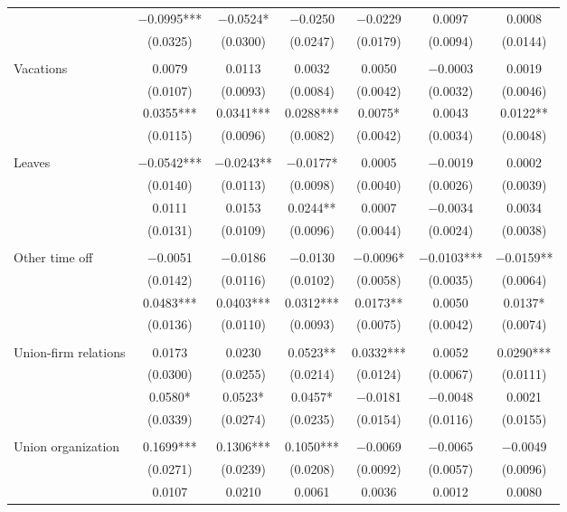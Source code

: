 \documentclass[12pt,letterpaper]{article}
\begin{document}
\begin{longtable}{l cccccc}
  & $-$0.0995*** & $-$0.0524* & $-$0.0250 & $-$0.0229 & 0.0097 & 0.0008 \\
  & (0.0325) & (0.0300) & (0.0247) & (0.0179) & (0.0094) & (0.0144) \\
 & & & & & & \\
\quad Vacations & 0.0079 & 0.0113 & 0.0032 & 0.0050 & $-$0.0003 & 0.0019 \\
  & (0.0107) & (0.0093) & (0.0084) & (0.0042) & (0.0032) & (0.0046) \\
  & 0.0355*** & 0.0341*** & 0.0288*** & 0.0075* & 0.0043 & 0.0122** \\
  & (0.0115) & (0.0096) & (0.0082) & (0.0042) & (0.0034) & (0.0048) \\
 & & & & & & \\
\quad Leaves & $-$0.0542*** & $-$0.0243** & $-$0.0177* & 0.0005 & $-$0.0019 & 0.0002 \\
  & (0.0140) & (0.0113) & (0.0098) & (0.0040) & (0.0026) & (0.0039) \\
  & 0.0111 & 0.0153 & 0.0244** & 0.0007 & $-$0.0034 & 0.0034 \\
  & (0.0131) & (0.0109) & (0.0096) & (0.0044) & (0.0024) & (0.0038) \\
 & & & & & & \\
\quad Other time off & $-$0.0051 & $-$0.0186 & $-$0.0130 & $-$0.0096* & $-$0.0103*** & $-$0.0159** \\
  & (0.0142) & (0.0116) & (0.0102) & (0.0058) & (0.0035) & (0.0064) \\
  & 0.0483*** & 0.0403*** & 0.0312*** & 0.0173** & 0.0050 & 0.0137* \\
  & (0.0136) & (0.0110) & (0.0093) & (0.0075) & (0.0042) & (0.0074) \\
 & & & & & & \\
\quad Union-firm relations & 0.0173 & 0.0230 & 0.0523** & 0.0332*** & 0.0052 & 0.0290*** \\
  & (0.0300) & (0.0255) & (0.0214) & (0.0124) & (0.0067) & (0.0111) \\
  & 0.0580* & 0.0523* & 0.0457* & $-$0.0181 & $-$0.0048 & 0.0021 \\
  & (0.0339) & (0.0274) & (0.0235) & (0.0154) & (0.0116) & (0.0155) \\
 & & & & & & \\
\quad Union organization & 0.1699*** & 0.1306*** & 0.1050*** & $-$0.0069 & $-$0.0065 & $-$0.0049 \\
  & (0.0271) & (0.0239) & (0.0208) & (0.0092) & (0.0057) & (0.0096) \\
  & 0.0107 & 0.0210 & 0.0061 & 0.0036 & 0.0012 & 0.0080 \\

\end{longtable}
\end{document}
